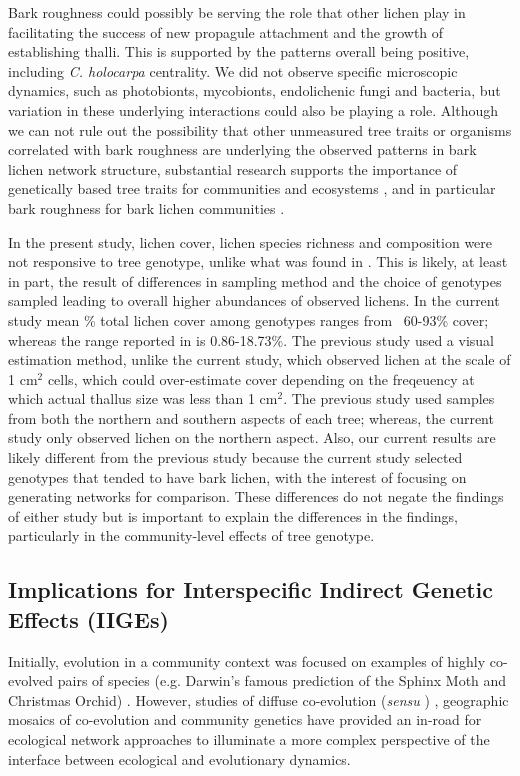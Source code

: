 \documentclass[11pt,twocolumn,twoside,lineno]{pnas-new}
\begin{document}
Bark roughness could possibly be serving the role that other lichen
play in facilitating the success of new propagule attachment and the
growth of establishing thalli. This is supported by the patterns
overall being positive, including \textit{C. holocarpa} centrality. We
did not observe specific microscopic dynamics, such as photobionts,
mycobionts, endolichenic fungi and bacteria, but variation in these
underlying interactions could also be playing a role. Although we can
not rule out the possibility that other unmeasured tree traits or
organisms correlated with bark roughness are underlying the observed
patterns in bark lichen network structure, substantial research
supports the importance of genetically based tree traits for
communities and ecosystems \cite{DesRoches2018TheVariation}, and in
particular bark roughness for bark lichen communities \cite{Bdeir2017,
  Lamit2011, Lamit2015a}.


In the present study, lichen cover, lichen species richness and
composition were not responsive to tree genotype, unlike what was
found in \citep{Lamit2015a}. This is likely, at least in part, the
result of differences in sampling method and the choice of genotypes
sampled leading to overall higher abundances of observed lichens. In
the current study mean \% total lichen cover among genotypes ranges
from ~60-93\% cover; whereas the range reported in \citep{Lamit2015a}
is 0.86-18.73\%.  The previous study used a visual estimation method,
unlike the current study, which observed lichen at the scale of 1
cm$^2$ cells, which could over-estimate cover depending on the
freqeuency at which actual thallus size was less than 1 cm$^2$.  The
previous study used samples from both the northern and southern
aspects of each tree; whereas, the current study only observed lichen
on the northern aspect.  Also, our current results are likely
different from the previous study because the current study selected
genotypes that tended to have bark lichen, with the interest of
focusing on generating networks for comparison. These differences do
not negate the findings of either study but is important to explain
the differences in the findings, particularly in the community-level
effects of tree genotype.

\subsection*{Implications for Interspecific Indirect Genetic Effects (IIGEs)}

Initially, evolution in a community context was focused on
examples of highly co-evolved pairs of species (e.g. Darwin's famous
prediction of the Sphinx Moth and Christmas Orchid)
\cite{Wade2007TheCommunities}. However, studies of diffuse
co-evolution (\textit{sensu} \cite{Janzen1980SpecificityForest})
\cite{StinchcombeCanHerbivores, Strauss2008EvolutionSize}, geographic
mosaics of co-evolution \cite{Thompson2013} and community genetics
\cite{Whitham2006a} have provided an in-road for ecological network
approaches \cite{Smith2015b, Keith2017, Lau2016GenotypicEvolution} to
illuminate a more complex perspective of the interface between
ecological and evolutionary dynamics. 
\end{document}
